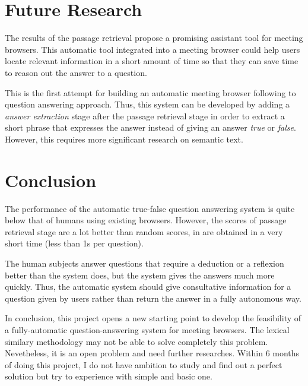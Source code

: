 
\chapter{Future Research}
The results of the passage retrieval propose a promising assistant tool for meeting browsers. This automatic tool integrated into a meeting browser could help users locate relevant information in a short amount of time so that they can save time to reason out the answer to a question.

This is the first attempt for building an automatic meeting browser following to question answering approach. Thus, this system can be developed by adding a \textit{answer extraction} stage after the passage retrieval stage in order to extract a short phrase that expresses the answer instead of giving an answer \textit{true} or \textit{false}. However, this requires more significant research on semantic text.

\chapter{Conclusion}

The performance of the automatic true-false question answering system is quite below that of humans using existing browsers. However, the scores of passage retrieval stage are a lot better   than random scores, in are obtained in a very short time (less than 1s per question).

The human subjects answer questions that require a deduction or a reflexion better than the system does, but the system gives the answers much more quickly. Thus, the automatic system should give consultative information for a question given by users rather than return the answer in a fully autonomous way.

In conclusion, this project opens a new starting point to develop the feasibility of a fully-automatic question-answering system for meeting browsers. The lexical similary methodology may not be able to solve completely this problem. Nevetheless, it is an open problem and need
further researches. Within 6 months of doing this project, I do not have ambition to study
and find out a perfect solution but try to experience with simple and basic one.